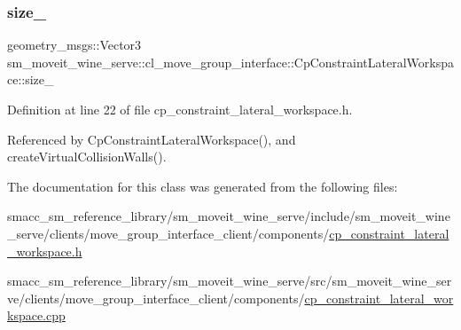 \subsubsection{\texorpdfstring{size\+\_\+}{size\_}}
{\footnotesize\ttfamily geometry\+\_\+msgs\+::\+Vector3 sm\+\_\+moveit\+\_\+wine\+\_\+serve\+::cl\+\_\+move\+\_\+group\+\_\+interface\+::\+Cp\+Constraint\+Lateral\+Workspace\+::size\+\_\+\hspace{0.3cm}{\ttfamily [private]}}



Definition at line 22 of file cp\+\_\+constraint\+\_\+lateral\+\_\+workspace.\+h.



Referenced by Cp\+Constraint\+Lateral\+Workspace(), and create\+Virtual\+Collision\+Walls().



The documentation for this class was generated from the following files\+:\begin{DoxyCompactItemize}
\item 
smacc\+\_\+sm\+\_\+reference\+\_\+library/sm\+\_\+moveit\+\_\+wine\+\_\+serve/include/sm\+\_\+moveit\+\_\+wine\+\_\+serve/clients/move\+\_\+group\+\_\+interface\+\_\+client/components/\hyperlink{sm__moveit__wine__serve_2include_2sm__moveit__wine__serve_2clients_2move__group__interface__clie53c77a9ae8e0cbc82640166beca74822}{cp\+\_\+constraint\+\_\+lateral\+\_\+workspace.\+h}\item 
smacc\+\_\+sm\+\_\+reference\+\_\+library/sm\+\_\+moveit\+\_\+wine\+\_\+serve/src/sm\+\_\+moveit\+\_\+wine\+\_\+serve/clients/move\+\_\+group\+\_\+interface\+\_\+client/components/\hyperlink{sm__moveit__wine__serve_2src_2sm__moveit__wine__serve_2clients_2move__group__interface__client_241f5590ea02f1d65431008d4c2689f32}{cp\+\_\+constraint\+\_\+lateral\+\_\+workspace.\+cpp}\end{DoxyCompactItemize}
